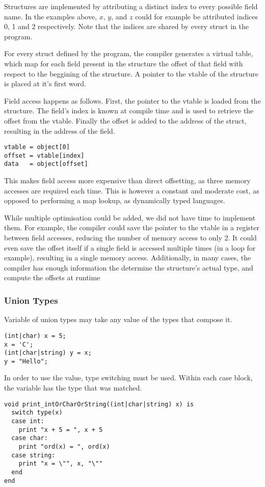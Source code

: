\documentclass{article}
\begin{document}
Structures are implemented by attributing a distinct index to every possible field name. In the examples
above, $x$, $y$, and $z$ could for example be attributed indices 0, 1 and 2 respectively.
Note that the indices are shared by every struct in the program.

For every struct defined by the program, the compiler generates a virtual table, which map for each field
present in the structure the offset of that field with respect to the beggining of the structure.
A pointer to the vtable of the structure is placed at it's first word.

Field access happens as follows. First, the pointer to the vtable is loaded from the structure. The field's
index is known at compile time and is used to retrieve the offset from the vtable. Finally the offset is
added to the address of the struct, resulting in the address of the field.

\begin{lstlisting}
vtable = object[0]
offset = vtable[index]
data   = object[offset]
\end{lstlisting}

This makes field access more expensive than direct offsetting, as three memory accesses are required each time.
This is however a constant and moderate cost, as opposed to performing a map lookup, as dynamically typed languages.

While multiple optimisation could be added, we did not have time to implement them.
For example, the compiler could save the pointer to the vtable in a register between field accesses, reducing the
number of memory access to only 2. It could even save the offset itself if a single field is accessed multiple
times (in a loop for example), resulting in a single memory access. Additionally, in many cases, the compiler
has enough information the determine the structure's actual type, and compute the offsets at runtime

\subsubsection{Union Types}
Variable of union types may take any value of the types that compose it.
\begin{lstlisting}
(int|char) x = 5;
x = 'C';
(int|char|string) y = x;
y = "Hello";
\end{lstlisting}

In order to use the value, type switching must be used. Within each case block, the variable has the type that was
matched.
\begin{lstlisting}
void print_intOrCharOrString((int|char|string) x) is
  switch type(x)
  case int:
    print "x + 5 = ", x + 5
  case char:
    print "ord(x) = ", ord(x)
  case string:
    print "x = \"", x, "\""
  end
end
\end{lstlisting}
\end{document}
